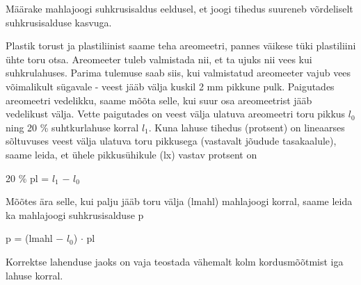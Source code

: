 
Määrake mahlajoogi suhkrusisaldus eeldusel, et joogi tihedus suureneb võrdeliselt suhkrusisalduse kasvuga.

\hint

\solu
Plastik torust ja plastiliinist saame teha areomeetri, pannes väikese tüki plastiliini ühte toru otsa. Areomeeter tuleb valmistada nii, et ta ujuks nii vees kui suhkrulahuses. Parima tulemuse saab siis, kui valmistatud areomeeter vajub vees võimalikult sügavale - veest jääb välja kuskil 2 mm pikkune pulk. Paigutades areomeetri vedelikku, saame mõõta selle, kui suur osa areomeetrist jääb vedelikust välja. Vette paigutades on veest välja ulatuva areomeetri toru pikkus $l_0$ ning 20 \% suhtkurlahuse korral $l_1$. Kuna lahuse tihedus (protsent) on lineaarses sõltuvuses veest välja ulatuva toru pikkusega (vastavalt jõudude tasakaalule), saame leida, et ühele pikkusühikule (lx) vastav protsent on

20 \% pl = $l_1$ $-$ $l_0$

Mõõtes ära selle, kui palju jääb toru välja (lmahl) mahlajoogi korral, saame leida ka mahlajoogi suhkrusisalduse p

p = (lmahl $-$ $l_0$) $\cdot$ pl

Korrektse lahenduse jaoks on vaja teostada vähemalt kolm kordusmõõtmist iga lahuse korral.
\probend
